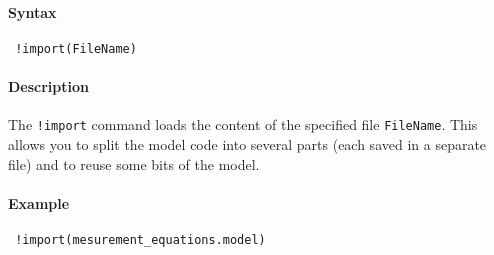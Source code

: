 


	\paragraph{Syntax}
 
 \begin{verbatim}
 !import(FileName)
 \end{verbatim}
 
 \paragraph{Description}
 
 The \texttt{!import} command loads the content of the specified file
 \texttt{FileName}. This allows you to split the model code into several
 parts (each saved in a separate file) and to reuse some bits of the
 model.
 
 \paragraph{Example}
 
 \begin{verbatim}
 !import(mesurement_equations.model)
 \end{verbatim}


